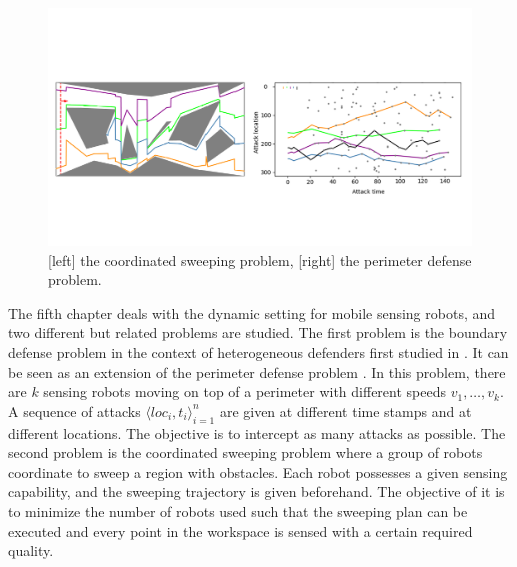 \begin{figure}[h]
    \centering
    \vspace{-.8in}
    \includegraphics[width=.8\textwidth]{figures/dynamic-intro.png}
    \vspace{-.5in}
    \caption[Illustration of sweeping and boundary defense]{[left] the coordinated sweeping problem, [right] the perimeter defense problem.}
    \label{fig:intro-bd-sc}
\end{figure}

The fifth chapter deals with the dynamic setting for mobile sensing robots, 
and two different but related problems are studied. 
The first problem is the boundary defense problem in the context of heterogeneous defenders first studied in \cite{adler2022role}.
It can be seen as an extension of the perimeter defense problem \cite{shishika2020review}. 
In this problem, there are $k$ sensing robots moving on top of a perimeter with different speeds $v_1,\dots,v_k$.
A sequence of attacks $\langle loc_i, t_i \rangle_{i=1}^{n}$ are given at different time stamps and at different locations.
The objective is to intercept as many attacks as possible.
The second problem is the coordinated sweeping problem where a group of robots coordinate to sweep a region 
with obstacles. Each robot possesses a given sensing capability, and the sweeping trajectory is 
given beforehand. The objective of it is to minimize the number of robots used such that the sweeping plan 
can be executed and every point in the workspace is sensed with a certain required quality. 

